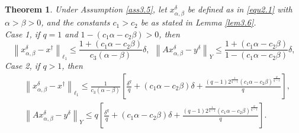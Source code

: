 \documentclass[a4paper,12pt]{article}
\newtheorem{theorem}{Theorem}[section]
\numberwithin{equation}{section}
\begin{document}
\begin{theorem}\label{the3.7}
    Under Assumption \ref{ass3.5}, let $x_{\alpha,\beta}^{\delta}$ be defined as in \eqref{equ2.1} with $\alpha>\beta>0$, and the constants $c_{1}>c_{2}$ be as stated in Lemma \ref{lem3.6}. \\
    Case 1, if $q=1$ and $1-\left(c_{1}\alpha-c_{2}\beta\right)>0$, then
    \begin{equation}\label{equ3.10}
        \left\|x_{\alpha,\beta}^{\delta}-x^{\dagger}\right\|_{\ell_{1}}\leq \frac{1+\left(c_{1}\alpha-c_{2}\beta\right)}{c_{3}\left(\alpha-\beta\right)}\delta, \ \  \left\|Ax_{\alpha,\beta}^{\delta}-y^{\delta}\right\|_{Y}\leq \frac{1+\left(c_{1}\alpha-c_{2}\beta\right)}{1-\left(c_{1}\alpha-c_{2}\beta\right)}\delta,
    \end{equation}
    Case 2, if $q>1$, then
    \begin{align}\label{equ3.11}
        & \left\|x_{\alpha,\beta}^{\delta}-x^{\dagger}\right\|_{\ell_{1}}\leq \frac{1}{c_{3}\left(\alpha-\beta\right)}\left[\frac{\delta^{q}}{q}+ \left(c_{1}\alpha-c_{2}\beta\right)\delta+ \frac{\left(q-1\right)2^{\frac{1}{q-1}}\left(c_{1}\alpha-c_{2}\beta\right)^{\frac{q}{q-1}}}{q}\right], \nonumber\\
        & \left\|Ax_{\alpha,\beta}^{\delta}-y^{\delta}\right\|_{Y}\leq q\left[\frac{\delta^{q}}{q}+ \left(c_{1}\alpha-c_{2}\beta\right)\delta+ \frac{\left(q-1\right)2^{\frac{1}{q-1}}\left(c_{1}\alpha-c_{2}\beta\right)^{\frac{q}{q-1}}}{q}\right].
    \end{align}
\end{theorem}
\end{document}
